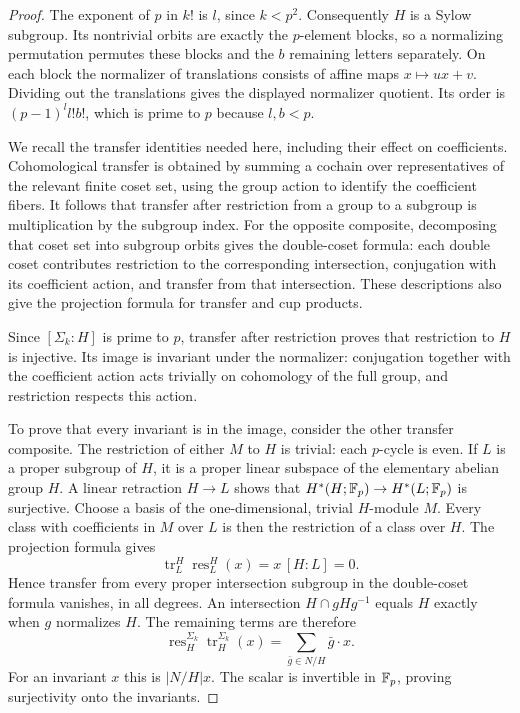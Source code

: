 \begin{proof}
The exponent of $p$ in $k!$ is $l$, since $k<p^2$.
Consequently $H$ is a Sylow subgroup. Its nontrivial orbits are
exactly the $p$-element blocks, so a normalizing permutation permutes
these blocks and the $b$ remaining letters separately. On each
block the normalizer of translations consists of affine maps
$x\mapsto ux+v$. Dividing out the translations gives the displayed
normalizer quotient. Its order is $(p-1)^l l!b!$, which is prime
to $p$ because $l,b<p$.

We recall the transfer identities needed here, including their
effect on coefficients. Cohomological transfer is obtained by
summing a cochain over representatives of the relevant finite
coset set, using the group action to identify the coefficient
fibers. It follows that transfer after restriction from a group to
a subgroup is multiplication by the subgroup index. For the
opposite composite, decomposing that coset set into subgroup orbits
gives the double-coset formula: each double coset contributes
restriction to the corresponding intersection, conjugation with
its coefficient action, and transfer from that intersection.
These descriptions also give the projection formula for transfer
and cup products.

Since $[\Sigma_k:H]$ is prime to $p$, transfer after restriction
proves that restriction to $H$ is injective. Its image is invariant
under the normalizer: conjugation together with the coefficient
action acts trivially on cohomology of the full group, and
restriction respects this action.

To prove that every invariant is in the image, consider the other
transfer composite. The restriction of either $M$ to $H$ is trivial:
each $p$-cycle is even. If $L$ is a proper subgroup of $H$, it is a
proper linear subspace of the elementary abelian group $H$. A
linear retraction $H\to L$ shows that
$H^*(H;\mathbb F_p)\to H^*(L;\mathbb F_p)$ is surjective. Choose a basis of the
one-dimensional, trivial $H$-module $M$. Every class with
coefficients in $M$ over $L$ is then the restriction of a class
over $H$. The projection formula gives
\[
 \operatorname{tr}_L^H\operatorname{res}_L^H(x)
   =x\,[H:L]=0.
\]
Hence transfer from every proper intersection subgroup in the
double-coset formula vanishes, in all degrees. An intersection
$H\cap gHg^{-1}$ equals $H$ exactly when $g$ normalizes $H$.
The remaining terms are therefore
\[
 \operatorname{res}_H^{\Sigma_k}
 \operatorname{tr}_H^{\Sigma_k}(x)
   =\sum_{\bar g\in N/H}\bar g\cdot x.
\]
For an invariant $x$ this is $|N/H|x$. The scalar is invertible in
$\mathbb F_p$, proving surjectivity onto the invariants.
\end{proof}

